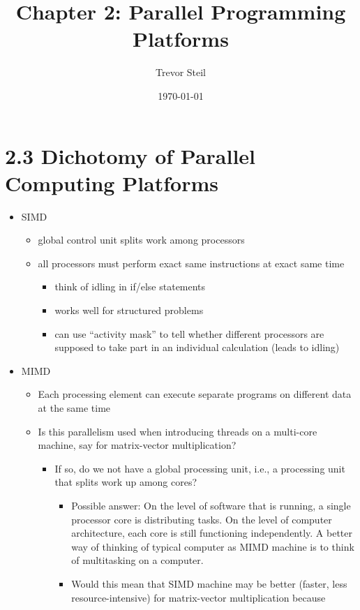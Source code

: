 \documentclass[a4paper]{article}
\title{Chapter 2: Parallel Programming Platforms}
\date{\today}
\author{Trevor Steil}
\begin{document}
\maketitle

\section{2.3 Dichotomy of Parallel Computing Platforms}

\begin{itemize}
  \item SIMD
    \begin{itemize}
      \item global control unit splits work among processors
      \item all processors must perform exact same instructions at exact same time
        \begin{itemize}
          \item think of idling in if/else statements
          \item works well for structured problems
          \item can use ``activity mask'' to tell whether different processors are supposed to take part in an individual calculation (leads to
            idling)
        \end{itemize}
    \end{itemize}
  \item MIMD
    \begin{itemize}
      \item Each processing element can execute separate programs on different data at the same time
      \item { \color{red} Is this parallelism used when introducing threads on a multi-core machine, say for matrix-vector multiplication? }
        \begin{itemize}
          \item \color{red} If so, do we not have a global processing unit, i.e., a processing unit that splits work up among cores?
            \begin{itemize}
              \item Possible answer: On the level of software that is running, a single processor core is distributing tasks. On the level of computer
                architecture, each core is still functioning independently. A better way of thinking of typical computer as MIMD machine is to think
                of multitasking on a computer.
              \item \color{red} Would this mean that SIMD machine may be better (faster, less resource-intensive) for matrix-vector multiplication because

\end{itemize}
\end{itemize}
\end{itemize}
\end{itemize}
\end{document}
